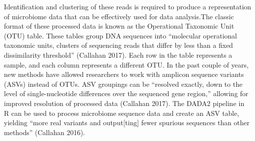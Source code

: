 \documentclass[12pt,twoside]{dukestatscithesis}
\begin{document}
Identification and clustering of these reads is required to produce a
representation of microbiome data that can be effectively used for data
analysis.The classic format of these processed data is known as the
Operational Taxonomic Unit (OTU) table. These tables group DNA sequences
into ``molecular operational taxonomic units, clusters of sequencing
reads that differ by less than a fixed dissimilarity threshold''
(Callahan 2017). Each row in the table represents a sample, and each
column represents a different OTU. In the past couple of years, new
methods have allowed researchers to work with amplicon sequence variants
(ASVs) instead of OTUs. ASV groupings can be ``resolved exactly, down to
the level of single-nucleotide differences over the sequenced gene
region,'' allowing for improved resolution of processed data (Callahan
2017). The DADA2 pipeline in R can be used to process microbiome
sequence data and create an ASV table, yielding ``more real variants and
output{[}ting{]} fewer spurious sequences than other methods'' (Callahan
2016).
\end{document}

